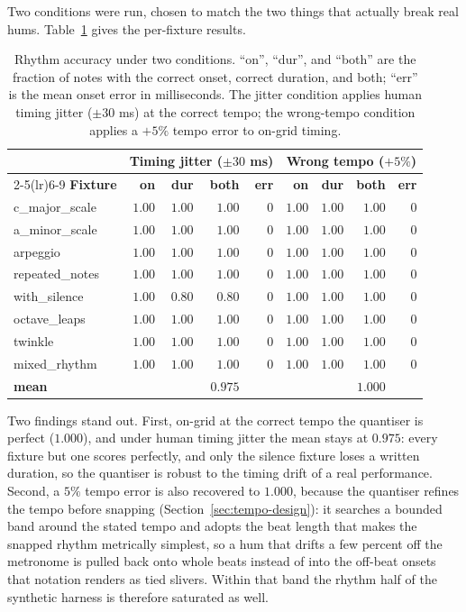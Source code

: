 \documentclass[12pt,a4paper]{article}
\begin{document}
Two conditions were run, chosen to match the two things that actually break
real hums. Table~\ref{tab:rhythm} gives the per-fixture results.

\begin{table}[H]
\centering
\caption{Rhythm accuracy under two conditions. ``on'', ``dur'', and ``both''
are the fraction of notes with the correct onset, correct duration, and both;
``err'' is the mean onset error in milliseconds. The jitter condition applies
human timing jitter ($\pm 30$ ms) at the correct tempo; the wrong-tempo
condition applies a $+5\%$ tempo error to on-grid timing.}
\label{tab:rhythm}
\begin{tabular}{l r r r r @{\hskip 1.5em} r r r r}
\toprule
 & \multicolumn{4}{c}{\textbf{Timing jitter ($\pm 30$ ms)}}
 & \multicolumn{4}{c}{\textbf{Wrong tempo ($+5\%$)}} \\
\cmidrule(lr){2-5}\cmidrule(lr){6-9}
\textbf{Fixture} & \textbf{on} & \textbf{dur} & \textbf{both} & \textbf{err} &
\textbf{on} & \textbf{dur} & \textbf{both} & \textbf{err} \\
\midrule
c\_major\_scale  & $1.00$ & $1.00$ & $1.00$ & $0$ & $1.00$ & $1.00$ & $1.00$ & $0$ \\
a\_minor\_scale  & $1.00$ & $1.00$ & $1.00$ & $0$ & $1.00$ & $1.00$ & $1.00$ & $0$ \\
arpeggio         & $1.00$ & $1.00$ & $1.00$ & $0$ & $1.00$ & $1.00$ & $1.00$ & $0$ \\
repeated\_notes  & $1.00$ & $1.00$ & $1.00$ & $0$ & $1.00$ & $1.00$ & $1.00$ & $0$ \\
with\_silence    & $1.00$ & $0.80$ & $0.80$ & $0$ & $1.00$ & $1.00$ & $1.00$ & $0$ \\
octave\_leaps    & $1.00$ & $1.00$ & $1.00$ & $0$ & $1.00$ & $1.00$ & $1.00$ & $0$ \\
twinkle          & $1.00$ & $1.00$ & $1.00$ & $0$ & $1.00$ & $1.00$ & $1.00$ & $0$ \\
mixed\_rhythm    & $1.00$ & $1.00$ & $1.00$ & $0$ & $1.00$ & $1.00$ & $1.00$ & $0$ \\
\midrule
\textbf{mean}    &        &        & $\mathbf{0.975}$ & & & & $\mathbf{1.000}$ & \\
\bottomrule
\end{tabular}
\end{table}

Two findings stand out. First, on-grid at the correct tempo the quantiser is
perfect ($1.000$), and under human timing jitter the mean stays at $0.975$: every
fixture but one scores perfectly, and only the silence fixture loses a written
duration, so the quantiser is robust to the timing drift of a real performance.
Second, a $5\%$ tempo error is also recovered to $1.000$, because the quantiser
refines the tempo before snapping (Section~\ref{sec:tempo-design}): it searches a
bounded band around the stated tempo and adopts the beat length that makes the
snapped rhythm metrically simplest, so a hum that drifts a few percent off the
metronome is pulled back onto whole beats instead of into the off-beat onsets
that notation renders as tied slivers. Within that band the rhythm half of the
synthetic harness is therefore saturated as well.
\end{document}
